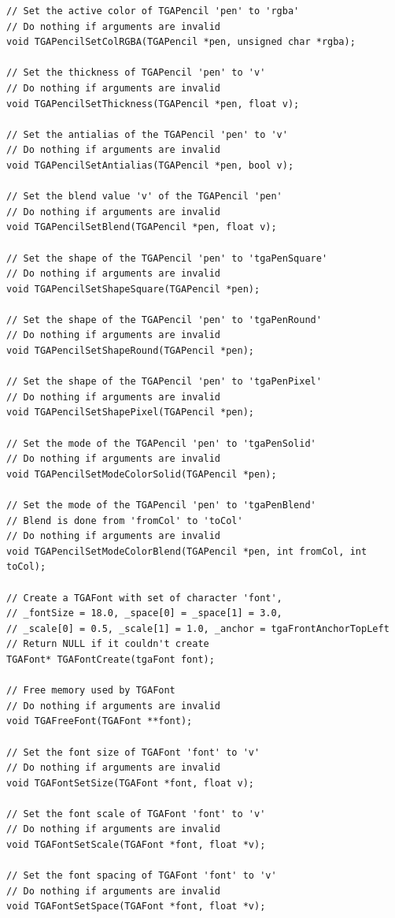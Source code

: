 \documentclass[12pt, a4paper]{article}
\begin{document}
\begin{scriptsize}
\begin{ttfamily}
\begin{lstlisting}
// Set the active color of TGAPencil 'pen' to 'rgba'
// Do nothing if arguments are invalid
void TGAPencilSetColRGBA(TGAPencil *pen, unsigned char *rgba);

// Set the thickness of TGAPencil 'pen' to 'v'
// Do nothing if arguments are invalid
void TGAPencilSetThickness(TGAPencil *pen, float v);

// Set the antialias of the TGAPencil 'pen' to 'v'
// Do nothing if arguments are invalid
void TGAPencilSetAntialias(TGAPencil *pen, bool v);

// Set the blend value 'v' of the TGAPencil 'pen'
// Do nothing if arguments are invalid
void TGAPencilSetBlend(TGAPencil *pen, float v);

// Set the shape of the TGAPencil 'pen' to 'tgaPenSquare'
// Do nothing if arguments are invalid
void TGAPencilSetShapeSquare(TGAPencil *pen);

// Set the shape of the TGAPencil 'pen' to 'tgaPenRound'
// Do nothing if arguments are invalid
void TGAPencilSetShapeRound(TGAPencil *pen);

// Set the shape of the TGAPencil 'pen' to 'tgaPenPixel'
// Do nothing if arguments are invalid
void TGAPencilSetShapePixel(TGAPencil *pen);

// Set the mode of the TGAPencil 'pen' to 'tgaPenSolid'
// Do nothing if arguments are invalid
void TGAPencilSetModeColorSolid(TGAPencil *pen);

// Set the mode of the TGAPencil 'pen' to 'tgaPenBlend'
// Blend is done from 'fromCol' to 'toCol'
// Do nothing if arguments are invalid
void TGAPencilSetModeColorBlend(TGAPencil *pen, int fromCol, int toCol);

// Create a TGAFont with set of character 'font', 
// _fontSize = 18.0, _space[0] = _space[1] = 3.0, 
// _scale[0] = 0.5, _scale[1] = 1.0, _anchor = tgaFrontAnchorTopLeft
// Return NULL if it couldn't create
TGAFont* TGAFontCreate(tgaFont font);

// Free memory used by TGAFont
// Do nothing if arguments are invalid
void TGAFreeFont(TGAFont **font);

// Set the font size of TGAFont 'font' to 'v'
// Do nothing if arguments are invalid
void TGAFontSetSize(TGAFont *font, float v);

// Set the font scale of TGAFont 'font' to 'v'
// Do nothing if arguments are invalid
void TGAFontSetScale(TGAFont *font, float *v);

// Set the font spacing of TGAFont 'font' to 'v'
// Do nothing if arguments are invalid
void TGAFontSetSpace(TGAFont *font, float *v);


\end{lstlisting}
\end{ttfamily}
\end{scriptsize}
\end{document}
